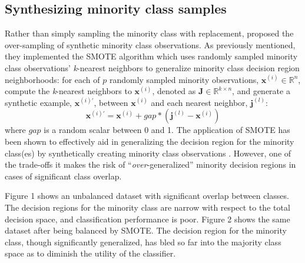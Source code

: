 \documentclass[twoside,11pt]{article}
\begin{document}
\subsection{Synthesizing minority class samples}

Rather than simply sampling the minority class with replacement, \cite{chawla2002smote} proposed the over-sampling of synthetic minority class observations.  As previously mentioned, they implemented the SMOTE algorithm which uses randomly sampled minority class observations' \emph{k}-nearest neighbors to generalize minority class decision region neighborhoods: for each of $p$ randomly sampled minority observations, $\mathbf{x}^{(i)} \in \mathbb{R}^{n}$, compute the \emph{k}-nearest neighbors to $\mathbf{x}^{(i)}$, denoted as $\mathbf{J} \in \mathbb{R}^{k \times n}$, and generate a synthetic example, $\mathbf{x}^{(i)\prime}$, between $\mathbf{x}^{(i)}$ and each nearest neighbor, $\mathbf{j}^{(l)}$:
\[
    \mathbf{x}^{(i)\prime} = \mathbf{x}^{(i)} + gap * (\mathbf{j}^{(l)} - \mathbf{x}^{(i)})
\]
where $gap$ is a random scalar between 0 and 1. The application of SMOTE has been shown to effectively aid in generalizing the decision region for the minority class(es) by synthetically creating minority class observations \citep*{chawla2002smote}. However, one of the trade-offs it makes the risk of ``\emph{over}-generalized'' minority decision regions in cases of significant class overlap.

Figure 1 shows an unbalanced dataset with significant overlap between classes. The decision regions for the minority class are narrow with respect to the total decision space, and classification performance is poor. Figure 2 shows the same dataset after being balanced by SMOTE. The decision region for the minority class, though significantly generalized, has bled so far into the majority class space as to diminish the utility of the classifier.

\end{document}
